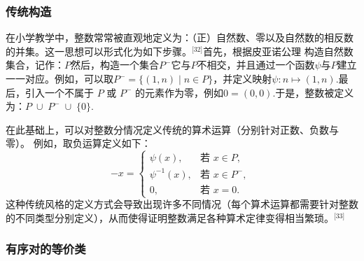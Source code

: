 \subsubsection{传统构造}
在小学教学中，整数常常被直观地定义为：（正）自然数、零以及自然数的相反数的并集。这一思想可以形式化为如下步骤。\(^\text{[32]}\)首先，根据皮亚诺公理 构造自然数集合，记作：$P$然后，构造一个集合$P^{-}$它与$P$不相交，并且通过一个函数$\psi$与$P$建立一一对应。例如，可以取$P^{-} = \{(1,n) \mid n \in P\}$，并定义映射$\psi : n \mapsto (1,n)$.最后，引入一个不属于 $P$ 或 $P^{-}$ 的元素作为零，例如$0 = (0,0)$.于是，整数被定义为：$P \;\cup\; P^{-} \;\cup\; \{0\}$.

在此基础上，可以对整数分情况定义传统的算术运算（分别针对正数、负数与零）。
例如，取负运算定义如下：
$$
-x =
\begin{cases}
\psi(x), & \text{若 } x \in P, \\[6pt]
\psi^{-1}(x), & \text{若 } x \in P^{-}, \\[6pt]
0, & \text{若 } x = 0.
\end{cases}~
$$
这种传统风格的定义方式会导致出现许多不同情况（每个算术运算都需要针对整数的不同类型分别定义），从而使得证明整数满足各种算术定律变得相当繁琐。\(^\text{[33]}\)
\subsubsection{有序对的等价类}